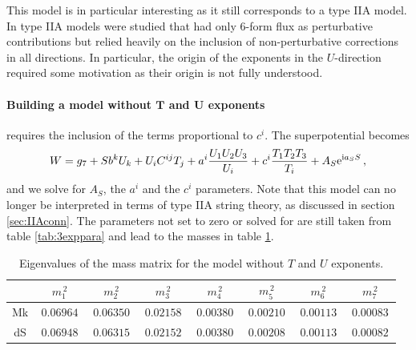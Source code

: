 \documentclass[a4paper,12pt]{report}
\newcommand{\be}{\begin{equation}}
\newcommand{\ee}{\end{equation}}
\def\rmi{{\rm i}}
\def\rme{{\rm e}}
\begin{document}
This model is in particular interesting as it still corresponds to a type IIA model. In \cite{Cribiori:2019drf,Cribiori:2019bfx} type IIA models were studied that had only 6-form flux as perturbative contributions but relied heavily on the inclusion of non-perturbative corrections in all directions. In particular, the origin of the exponents in the $U$-direction required some motivation as their origin is not fully understood.

\FloatBarrier
\paragraph{Building a model without $\mathbf{T}$ and $\mathbf{U}$ exponents} requires the inclusion of the terms proportional  to $c^i$. The superpotential becomes
\be
W = g_7 + S b^k U_k + U_i C^{ij} T_j + a^i \frac{U_1 U_2 U_3}{U_i} + c^i \frac{T_1 T_2 T_3}{T_i} + A_S \rme^{\rmi a_S S}\,,
\ee
and we solve for $A_S$, the $a^i$ and the $c^i$ parameters. Note that this model can no longer be interpreted in terms of type IIA string theory, as discussed in section \ref{sec:IIAconn}. The parameters not set to zero or solved for are still taken from table \ref{tab:3exppara} and lead to the masses in table \ref{tab:noTUmass}.
\begin{table}[htb]
\center
\begin{tabular}{|c|c|c|c|c|c|c|c|}\hline
     &$\,m_1^{\,2}\,$&$\,m_2^{\,2}\,$&$\,m_3^{\,2}\,$&$\,m_4^{\,2}\,$&$\,m_5^{\,2}\,$&$\,m_6^{\,2}\,$&$\,m_7^{\,2}\,$\\\hline
Mk & $\, 0.06964 \,$ & $\, 0.06350 \,$ & $\, 0.02158 \,$ & $\, 0.00380 \,$ & $\, 0.00210 \,$ & $\, 0.00113 \,$ & $\, 0.00083 \,$ \\\hline  
dS & $\, 0.06948 \,$ & $\, 0.06315 \,$ & $\, 0.02152 \,$ & $\, 0.00380 \,$ & $\, 0.00208 \,$ & $\, 0.00113 \,$ & $\, 0.00082 \,$  \\\hline  
\end{tabular}
\caption{Eigenvalues of the mass matrix for the model without $T$ and $U$ exponents.}
\label{tab:noTUmass}
\end{table}

\FloatBarrier
\end{document}
